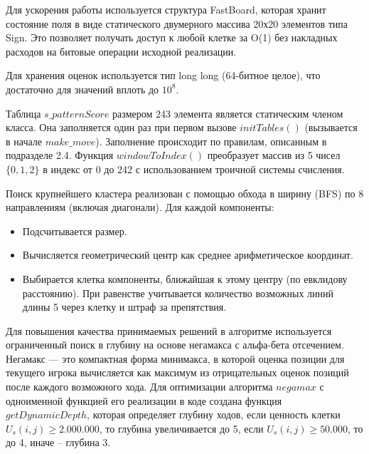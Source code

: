 \documentclass[14pt]{extreport}
\begin{document}
Для ускорения работы используется структура FastBoard, которая хранит состояние поля в виде статического двумерного массива 20х20 элементов типа Sign. Это позволяет получать доступ к любой клетке за O(1) без накладных расходов на битовые операции исходной реализации.

Для хранения оценок используется тип long long (64-битное целое), что достаточно для значений вплоть до $10^8$.

Таблица $s\_patternScore$ размером 243 элемента является статическим членом класса. Она заполняется один раз при первом вызове $initTables()$ (вызывается в начале $make\_move$). Заполнение происходит по правилам, описанным в подразделе 2.4.
Функция $windowToIndex()$ преобразует массив из 5 чисел $\{0,1,2\}$ в индекс от 0 до 242 с использованием троичной системы счисления.

Поиск крупнейшего кластера реализован с помощью обхода в ширину (BFS) по 8 направлениям (включая диагонали). Для каждой компоненты:
\begin{itemize}
    \item Подсчитывается размер.
    \item Вычисляется геометрический центр как среднее арифметическое координат.
    \item Выбирается клетка компоненты, ближайшая к этому центру (по евклидову расстоянию). При равенстве учитывается количество возможных линий длины 5 через клетку и штраф за препятствия.
\end{itemize}

Для повышения качества принимаемых решений в алгоритме используется ограниченный поиск в глубину на основе негамакса с альфа-бета отсечением. Негамакс — это компактная форма минимакса, в которой оценка позиции для текущего игрока вычисляется как максимум из отрицательных оценок позиций после каждого возможного хода.
Для оптимизации алгоритма $negamax$ с одноименной функцией его реализации в коде создана функция $getDynamicDepth$, которая определяет глубину ходов, если ценность клетки  $U_s(i, j) \geq 2.000.000$, то глубина увеличивается до 5, если $U_s(i, j) \geq 50.000$, то до 4, иначе -- глубина 3.
\end{document}
